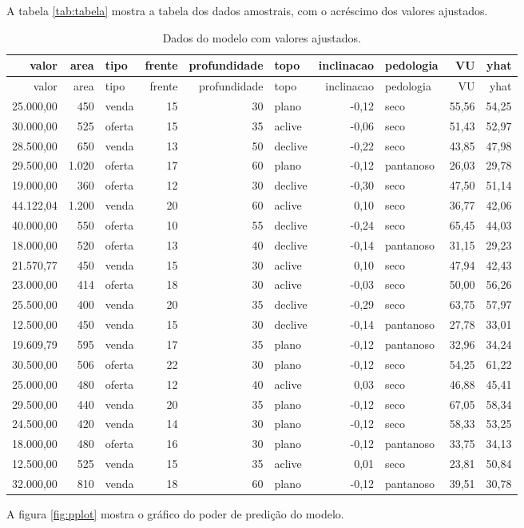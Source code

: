 \documentclass[a4paper, 12pt]{article}
\begin{document}
A tabela \ref{tab:tabela} mostra a tabela dos dados amostrais, com o
acréscimo dos valores ajustados.

\begin{longtable}[]{@{}rrlrrlrlrr@{}}
\caption{Dados do modelo com valores ajustados.}\tabularnewline
\toprule
valor & area & tipo & frente & profundidade & topo & inclinacao &
pedologia & VU & yhat\tabularnewline
\midrule
\endfirsthead
\toprule
valor & area & tipo & frente & profundidade & topo & inclinacao &
pedologia & VU & yhat\tabularnewline
\midrule
\endhead
25.000,00 & 450 & venda & 15 & 30 & plano & -0,12 & seco & 55,56 &
54,25\tabularnewline
30.000,00 & 525 & oferta & 15 & 35 & aclive & -0,06 & seco & 51,43 &
52,97\tabularnewline
28.500,00 & 650 & venda & 13 & 50 & declive & -0,22 & seco & 43,85 &
47,98\tabularnewline
29.500,00 & 1.020 & oferta & 17 & 60 & plano & -0,12 & pantanoso & 26,03
& 29,78\tabularnewline
19.000,00 & 360 & oferta & 12 & 30 & declive & -0,30 & seco & 47,50 &
51,14\tabularnewline
44.122,04 & 1.200 & venda & 20 & 60 & aclive & 0,10 & seco & 36,77 &
42,06\tabularnewline
40.000,00 & 550 & oferta & 10 & 55 & declive & -0,24 & seco & 65,45 &
44,03\tabularnewline
18.000,00 & 520 & oferta & 13 & 40 & declive & -0,14 & pantanoso & 31,15
& 29,23\tabularnewline
21.570,77 & 450 & venda & 15 & 30 & aclive & 0,10 & seco & 47,94 &
42,43\tabularnewline
23.000,00 & 414 & oferta & 18 & 30 & aclive & -0,03 & seco & 50,00 &
56,26\tabularnewline
25.500,00 & 400 & venda & 20 & 35 & declive & -0,29 & seco & 63,75 &
57,97\tabularnewline
12.500,00 & 450 & venda & 15 & 30 & declive & -0,14 & pantanoso & 27,78
& 33,01\tabularnewline
19.609,79 & 595 & venda & 17 & 35 & plano & -0,12 & pantanoso & 32,96 &
34,24\tabularnewline
30.500,00 & 506 & oferta & 22 & 30 & plano & -0,12 & seco & 54,25 &
61,22\tabularnewline
25.000,00 & 480 & oferta & 12 & 40 & aclive & 0,03 & seco & 46,88 &
45,41\tabularnewline
29.500,00 & 440 & venda & 20 & 35 & plano & -0,12 & seco & 67,05 &
58,34\tabularnewline
24.500,00 & 420 & venda & 14 & 30 & plano & -0,12 & seco & 58,33 &
53,25\tabularnewline
18.000,00 & 480 & oferta & 16 & 30 & plano & -0,12 & pantanoso & 33,75 &
34,13\tabularnewline
12.500,00 & 525 & venda & 15 & 35 & aclive & 0,01 & seco & 23,81 &
50,84\tabularnewline
32.000,00 & 810 & venda & 18 & 60 & plano & -0,12 & pantanoso & 39,51 &
30,78\tabularnewline
\bottomrule
\end{longtable}

A figura \ref{fig:pplot} mostra o gráfico do poder de predição do
modelo.
\end{document}
